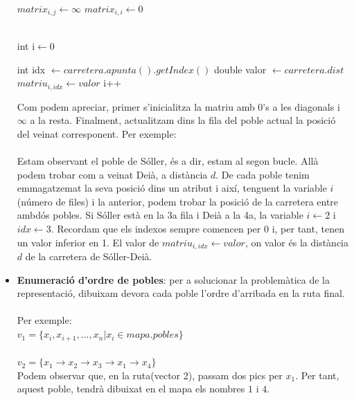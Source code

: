 \documentclass[conference]{IEEEtran}
\begin{document}
\begin{itemize}
\begin{algorithm}
\begin{algorithmic}[1]
                        \State $matrix_{i,j} \gets \infty$
                    \EndFor
                    \State $matrix_{i,i}\gets 0$
                \EndFor
                
                \\
    
                \State int i$\gets 0$
                
                        \State int idx $\gets carretera.apunta().getIndex()$
                        \State double valor $\gets carretera.dist$
                        \State $matriu_{i,idx} \gets valor$
                    \EndFor
                    \State i++
                \EndFor
                
                \end{algorithmic}
            \end{algorithm}
            Com podem apreciar, primer s'inicialitza la matriu amb 0's  a les diagonals i $\infty$ a la resta. Finalment, actualitzam dins la fila del poble actual la posició del veinat corresponent. Per exemple:\\
            \\
            Estam observant el poble de Sóller, és a dir, estam al segon bucle. Allà podem trobar com a veinat Deià, a distància $d$. De cada poble tenim emmagatzemat la seva posició dins un atribut i així, tenguent la variable $i$(número de files) i la anterior, podem trobar la posició de la carretera entre ambdós pobles. Si Sóller està en la 3a fila i Deià a la 4a, la variable $i\gets 2$ i $idx\gets 3$. Recordam que els indexos sempre comencen per 0 i, per tant, tenen un valor inferior en 1. El valor de 
            $matriu_{i,idx}\gets valor$, on valor és la distància $d$ de la carretera de Sóller-Deià.
            \\
            
            
        \item \textbf{Enumeració d'ordre de pobles}: per a solucionar la problemàtica de la representació, dibuixam devora cada poble l'ordre d'arribada en la ruta final.\\ \\
        Per exemple: \\ 
    
        $v_{1}=\{x_{i},x_{i+1},...,x_{n}| x_{i} \in mapa.pobles\}$ \\ \\
        $v_{2}=\{x_1 \rightarrow x_2 \rightarrow x_3 \rightarrow x_1 \rightarrow x_4 \}$ \\
    
        Podem observar que, en la ruta(vector 2), passam dos pics per $x_1$. Per tant, aquest poble, tendrà dibuixat en el mapa els nombres $1$ i $4$.
        \end{itemize}
\end{document}
